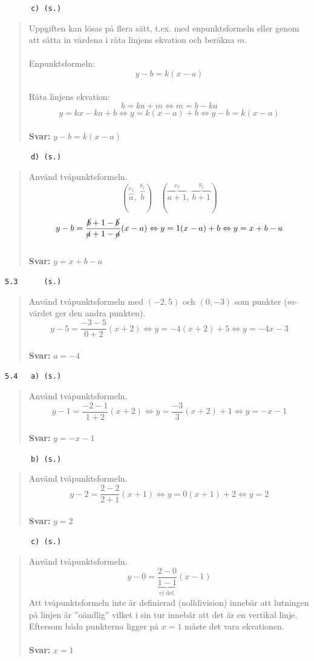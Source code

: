 \documentclass[a4paper]{article}
\newcommand{\tskcol}[1]{\textcolor{tskcol}{#1}}
\begin{document}
	\pagebreak
	\texttt{\tskcol{~~~~~~c) (s.)}}
	\begin{quotation}
		\noindent
		Uppgiften kan lösas på flera sätt, t.ex. med enpunktsformeln eller genom att sätta in värdena i räta linjens ekvation och beräkna $m$.
		\\ \\
		Enpunktsformeln: 
		\[y-b=k(x-a)\]
		\\
		Räta linjens ekvation:
		\[b=ka+m \Leftrightarrow
		m=b-ka
		\]\[
		y=kx-ka+b \Leftrightarrow
		y=k(x-a)+b \Leftrightarrow
		y-b=k(x-a)\]
		\\
		\textbf{Svar:} $y-b=k(x-a)$
	\end{quotation}
	
	\texttt{\tskcol{~~~~~~d) (s.)}}
	\begin{quotation}
		\noindent
		Använd tvåpunktsformeln.
		\[(\overbrace{a}^{x_1},~\overbrace{b}^{y_1})~~~~(\overbrace{a+1}^{x_2},~\overbrace{b+1}^{y_2})\]
		\[y-b=\frac{\cancel{b}+1-\cancel{b}}{\cancel{a}+1-\cancel{a}}(x-a)\Leftrightarrow
		y=1(x-a)+b \Leftrightarrow
		y=x+b-a\]
		\\
		\textbf{Svar:} $y=x+b-a$
	\end{quotation}
	
	\texttt{\tskcol{5.3~~~~~ (s.)}}
	\begin{quotation}
		\noindent
		Använd tvåpunktsformeln med $(-2,5)$ och $(0,-3)$ som punkter ($m$-värdet ger den andra punkten).
		\[y-5=\frac{-3-5}{0+2}(x+2) \Leftrightarrow
		y=-4(x+2)+5 \Leftrightarrow
		y=-4x-3\]
		\\
		\textbf{Svar:} $a=-4$
	\end{quotation}
	
	\texttt{\tskcol{5.4~~~a) (s.)}}
	\begin{quotation}
		\noindent
		Använd tvåpunktsformeln.
		\[y-1=\frac{-2-1}{1+2}(x+2) \Leftrightarrow
		y=\frac{-3}{3}(x+2)+1 \Leftrightarrow
		y=-x-1\]
		\\
		\textbf{Svar:} $y=-x-1$
	\end{quotation}
	
	\texttt{\tskcol{~~~~~~b) (s.)}}
	\begin{quotation}
		\noindent
		Använd tvåpunktsformeln.
		\[y-2=\frac{2-2}{2+1}(x+1) \Leftrightarrow
		y=0(x+1)+2 \Leftrightarrow
		y=2\]
		\\
		\textbf{Svar:} $y=2$
	\end{quotation}
	
	\texttt{\tskcol{~~~~~~c) (s.)}}
	\begin{quotation}
		\noindent
		Använd tvåpunktsformeln.
		\[y-0=\underbrace{\frac{2-0}{1-1}}_\text{ej def.}(x-1)\]
		Att tvåpunktsformeln inte är definierad (nolldivision) innebär att lutningen på linjen är ''oändlig'' vilket i sin tur innebär att det är en vertikal linje. Eftersom båda punkterna ligger på $x=1$ måste det vara ekvationen. 
		\\ \\
		\textbf{Svar:} $x=1$
	\end{quotation}
	
\end{document}

